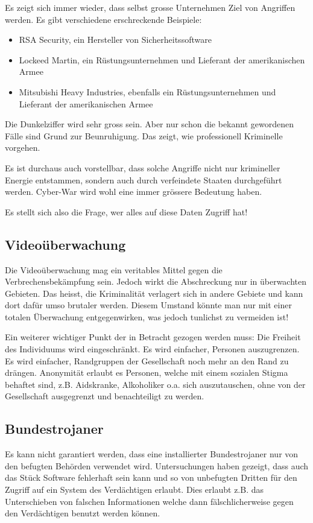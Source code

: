Es zeigt sich immer wieder, dass selbst grosse Unternehmen Ziel von Angriffen
werden. Es gibt verschiedene erschreckende Beispiele:
\begin{itemize}
\item RSA Security, ein Hersteller von Sicherheitssoftware
\item Lockeed Martin, ein Rüstungsunternehmen und Lieferant der amerikanischen Armee
\item Mitsubishi Heavy Industries, ebenfalls ein Rüstungsunternehmen und
Lieferant der amerikanischen Armee
\end{itemize}

Die Dunkelziffer wird sehr gross sein. Aber nur schon die bekannt gewordenen
Fälle sind Grund zur Beunruhigung. Das zeigt, wie professionell
Kriminelle vorgehen.

Es ist durchaus auch vorstellbar, dass solche Angriffe nicht nur krimineller
Energie entstammen, sondern auch durch verfeindete Staaten durchgeführt werden.
Cyber-War wird wohl eine immer grössere Bedeutung haben.

Es stellt sich also die Frage, wer alles auf diese Daten Zugriff hat!
\subsection*{Videoüberwachung}
Die Videoüberwachung mag ein veritables Mittel gegen die Verbrechensbekämpfung sein.
Jedoch wirkt die Abschreckung nur in überwachten Gebieten.
Das heisst, die Kriminalität verlagert sich in andere Gebiete und
kann dort dafür umso brutaler werden.
Diesem Umstand könnte man nur mit einer totalen Überwachung entgegenwirken,
was jedoch tunlichst zu vermeiden ist!

Ein weiterer wichtiger Punkt der in Betracht gezogen werden muss:
Die Freiheit des Individuums wird eingeschränkt. Es wird einfacher,
Personen auszugrenzen. Es wird einfacher, Randgruppen der Gesellschaft noch 
mehr an den Rand zu drängen. Anonymität erlaubt es Personen, welche mit einem
sozialen Stigma behaftet sind, z.B. Aidskranke, Alkoholiker o.a. sich 
auszutauschen, ohne von der Gesellschaft ausgegrenzt und benachteiligt
zu werden.

\subsection*{Bundestrojaner}
Es kann nicht garantiert werden, dass eine installierter Bundestrojaner nur
von den befugten Behörden verwendet wird. Untersuchungen haben gezeigt, dass
auch das Stück Software fehlerhaft sein kann und so von unbefugten Dritten für
den Zugriff auf ein System des Verdächtigen erlaubt. Dies erlaubt z.B. das
Unterschieben von falschen Informationen welche dann fälschlicherweise gegen
den Verdächtigen benutzt werden können.


